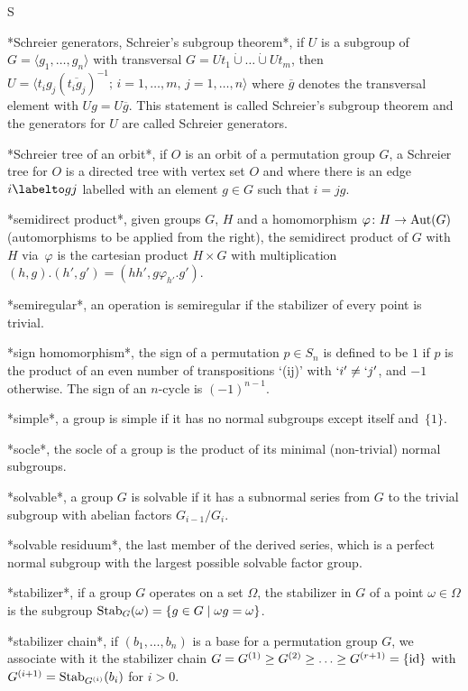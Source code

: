  S

*Schreier generators, Schreier's subgroup theorem*,  if $U$ is a subgroup
of      $G=\langle    g_1,\ldots,g_n\rangle$   with  transversal  $G=Ut_1
\mathbin{\dot\cup}  \ldots \mathbin{\dot\cup}  Ut_m$,  then  $U = \langle
t_ig_j (\overline{t_ig_j})^{-1};\, i=1,\ldots,m, \, j=1,\ldots,n \rangle$
where $\overline g$  denotes the transversal element with  $Ug=U\overline
g$.   This statement  is   called  Schreier's subgroup  theorem  and  the
generators for $U$ are called Schreier generators.

*Schreier tree of an  orbit*, if $O$  is an orbit  of a permutation group
$G$, a Schreier tree for $O$  is a directed tree with  vertex set $O$ and
where there is an edge $i \labelto g j$ labelled with an element $g\in G$
such that $i=jg$.

*semidirect   product*, given   groups    $G$, $H$   and  a  homomorphism
$\varphi\colon H\to {\rm Aut}(G)$ (automorphisms  to be applied from  the
right),  the semidirect product  of  $G$  with~$H$ via~$\varphi$  is  the
cartesian  product $H\times  G$   with  multiplication  $(h,g).(h',g')  =
(hh',g\varphi_{h'}.g')$.

*semiregular*, an operation  is semiregular if   the stabilizer of  every
point is trivial.

*sign homomorphism*,  the sign of a  permutation $p\in S_n$ is defined to
be $1$ if $p$  is the product of an  even number of transpositions `(ij)'
with   $`i' \ne `j'$, and  $-1$  otherwise. The  sign  of an $n$-cycle is
$(-1)^{n-1}$.

*simple*, a group  is simple if it has  no normal subgroups except itself
and~$\{1\}$.

*socle*, the socle of a group is the product of its minimal (non-trivial)
normal subgroups.

*solvable*, a group $G$ is solvable if it has a subnormal series from $G$
to the trivial subgroup with abelian factors $G_{i-1}/G_i$.

*solvable residuum*,  the last member of the  derived series, which  is a
perfect normal subgroup with the largest possible solvable factor group.

*stabilizer*,  if a group $G$ operates  on a set $\Omega$, the stabilizer
in $G$ of a point $\omega\in\Omega$ is the subgroup ${\rm Stab}_G(\omega)
= \{g\in G\mid \omega g=\omega\}$.

*stabilizer  chain*, if $(b_1,\ldots,b_n)$   is a base  for a permutation
group $G$, we  associate with it the stabilizer  chain  $G = G^{(1)}  \ge
G^{(2)}  \ge  \ldots \ge G^{(r+1)}  =  \{{\rm id}\}$ with $G^{(i+1)}={\rm
Stab}_{G^{(i)}}(b_i)$ for $i>0$.


